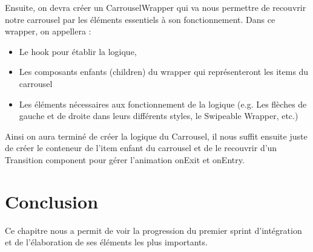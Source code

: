 \documentclass[../main.tex]{subfiles}
\begin{document}
Ensuite, on devra créer un CarrouselWrapper qui va nous permettre de recouvrir notre carrousel par les éléments essentiels à son fonctionnement. Dans ce wrapper, on appellera :
\begin{itemize}
\item Le hook pour établir la logique, 
\item Les composants enfants (children) du wrapper qui représenteront les items du carrousel 
\item Les éléments nécessaires aux fonctionnement de la logique (e.g. Les flèches de gauche et de droite dans leurs différents styles, le Swipeable Wrapper, etc.)
\end{itemize}
Ainsi on aura terminé de créer la logique du Carrousel, il nous suffit ensuite juste de créer le conteneur de l'item enfant du carrousel et de le recouvrir d'un Transition component pour gérer l'animation onExit et onEntry. 

\section{Conclusion}
Ce chapitre nous a permit de voir la progression du premier sprint d'intégration et de l'élaboration de ses éléments les plus importants. 
\end{document}
